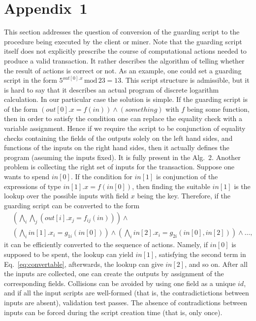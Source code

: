 \documentclass[runningheads]{llncs}
\begin{document}
    \section{Appendix~1}
    \label{appendix1}
    This section addresses the question of conversion of the guarding script to
    the procedure being executed by the client or miner. Note that the guarding
    script itself does not explicitly prescribe the course of computational
    actions needed to produce a valid transaction. It rather describes the
    algorithm of telling whether the result of actions is correct or not. As an
    example, one could set a guarding script in the form
    $5^{out[0].x}\,\textrm{mod}\, 23 = 13$. This script structure is admissible,
    but it is hard to say that it describes an actual program of discrete
    logarithm calculation. In our particular case the solution is simple. If the
    guarding script is of the form $(out[0].x=f(in))\wedge(something)$ with $f$
    being some function, then in order to satisfy the condition one can replace
    the equality check with a variable assignment. Hence if we require the script
    to be conjunction of equality checks containing the fields of the outputs
    solely on the left hand sides, and functions of the inputs on the right hand
    sides, then it actually defines the program (assuming the inputs fixed). It
    is fully present in the Alg.~2. Another problem is collecting the right set
    of inputs for the transaction. Suppose one wants to spend $in[0]$. If the
    condition for $in[1]$ is conjunction of the expressions of type
    $in[1].x=f(in[0])$, then finding the suitable $in[1]$ is the lookup over the
    possible inputs with field $x$ being the key. Therefore, if the guarding
    script can be converted to the form
    \begin{eqnarray}
        \nonumber
        &\left(\bigwedge_i\bigwedge_j(out[i].x_j=f_{ij}(in))\right)\wedge \\ 
        &\left(\bigwedge_i in[1].x_i  = g_{1i}(in[0])\right)\wedge
        \left(\bigwedge_i in[2].x_i =
        g_{2i}(in[0],in[2])\right)\wedge\dots,
        \label{eq:convertable}
    \end{eqnarray}
    it can be efficiently converted to the sequence of actions. Namely, if
    $in[0]$ is supposed to be spent, the lookup can yield $in[1]$, satisfying
    the second term in Eq.~\ref{eq:convertable}, afterwards, the lookup can give
    $in[2]$, and so on. After all the inputs are collected, one can create the
    outputs by assignment of the corresponding fields. Collisions can be avoided
    by using one field as a unique $id$, and if all the input scripts are
    well-formed (that is, the contradictictions between inputs are absent),
    validation test passes. The absence of contradictions between inputs can be
    forced during the script creation time (that is, only once).
\end{document}
